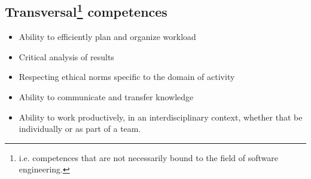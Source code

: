 \documentclass[a4paper]{article}
\begin{document}
        \subsection*{Transversal\footnote{i.e. competences that are not necessarily bound to the field of software engineering.} competences}
            \begin{itemize}
                \item Ability to efficiently plan and organize workload 
                \item Critical analysis of results
                \item Respecting ethical norms specific to the domain of activity
                \item Ability to communicate and transfer knowledge
                \item Ability to work productively, in an interdisciplinary context, whether that be individually or as part of a team.
            \end{itemize}

    \newpage
    \printbibliography
\end{document}
